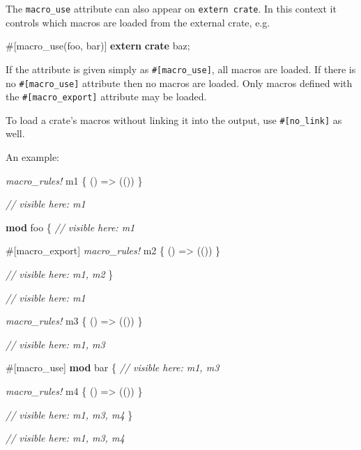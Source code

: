 \documentclass[a4paper,]{book}
\newenvironment{Shaded}{\begin{snugshade}}{\end{snugshade}}
\newcommand{\KeywordTok}[1]{\textcolor[rgb]{0.13,0.29,0.53}{\textbf{{#1}}}}
\newcommand{\CommentTok}[1]{\textcolor[rgb]{0.56,0.35,0.01}{\textit{{#1}}}}
\newcommand{\PreprocessorTok}[1]{\textcolor[rgb]{0.56,0.35,0.01}{\textit{{#1}}}}
\newcommand{\AttributeTok}[1]{\textcolor[rgb]{0.77,0.63,0.00}{{#1}}}
\newcommand{\NormalTok}[1]{{#1}}
\begin{document}
The \texttt{macro\_use} attribute can also appear on
\texttt{extern\ crate}. In this context it controls which macros are
loaded from the external crate, e.g.

\begin{Shaded}
\begin{Highlighting}[]
\AttributeTok{#[}\NormalTok{macro_use}\AttributeTok{(}\NormalTok{foo}\AttributeTok{,} \NormalTok{bar}\AttributeTok{)]}
\KeywordTok{extern} \KeywordTok{crate} \NormalTok{baz;}
\end{Highlighting}
\end{Shaded}

If the attribute is given simply as \texttt{\#{[}macro\_use{]}}, all
macros are loaded. If there is no \texttt{\#{[}macro\_use{]}} attribute
then no macros are loaded. Only macros defined with the
\texttt{\#{[}macro\_export{]}} attribute may be loaded.

To load a crate's macros without linking it into the output, use
\texttt{\#{[}no\_link{]}} as well.

An example:

\begin{Shaded}
\begin{Highlighting}[]
\PreprocessorTok{macro_rules!} \NormalTok{m1 \{ () => (()) \}}

\CommentTok{// visible here: m1}

\KeywordTok{mod} \NormalTok{foo \{}
    \CommentTok{// visible here: m1}

    \AttributeTok{#[}\NormalTok{macro_export}\AttributeTok{]}
    \PreprocessorTok{macro_rules!} \NormalTok{m2 \{ () => (()) \}}

    \CommentTok{// visible here: m1, m2}
\NormalTok{\}}

\CommentTok{// visible here: m1}

\PreprocessorTok{macro_rules!} \NormalTok{m3 \{ () => (()) \}}

\CommentTok{// visible here: m1, m3}

\AttributeTok{#[}\NormalTok{macro_use}\AttributeTok{]}
\KeywordTok{mod} \NormalTok{bar \{}
    \CommentTok{// visible here: m1, m3}

    \PreprocessorTok{macro_rules!} \NormalTok{m4 \{ () => (()) \}}

    \CommentTok{// visible here: m1, m3, m4}
\NormalTok{\}}

\CommentTok{// visible here: m1, m3, m4}
\end{Highlighting}
\end{Shaded}
\end{document}
